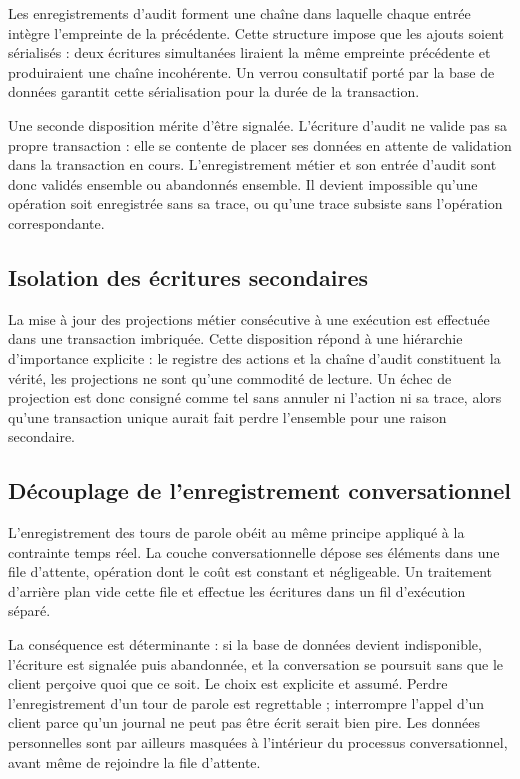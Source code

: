 Les enregistrements d'audit forment une chaîne dans laquelle chaque entrée intègre l'empreinte de la précédente. Cette structure impose que les ajouts soient sérialisés : deux écritures simultanées liraient la même empreinte précédente et produiraient une chaîne incohérente. Un verrou consultatif porté par la base de données garantit cette sérialisation pour la durée de la transaction.

Une seconde disposition mérite d'être signalée. L'écriture d'audit ne valide pas sa propre transaction : elle se contente de placer ses données en attente de validation dans la transaction en cours. L'enregistrement métier et son entrée d'audit sont donc validés ensemble ou abandonnés ensemble. Il devient impossible qu'une opération soit enregistrée sans sa trace, ou qu'une trace subsiste sans l'opération correspondante.

\subsection{Isolation des écritures secondaires}

La mise à jour des projections métier consécutive à une exécution est effectuée dans une transaction imbriquée. Cette disposition répond à une hiérarchie d'importance explicite : le registre des actions et la chaîne d'audit constituent la vérité, les projections ne sont qu'une commodité de lecture. Un échec de projection est donc consigné comme tel sans annuler ni l'action ni sa trace, alors qu'une transaction unique aurait fait perdre l'ensemble pour une raison secondaire.

\subsection{Découplage de l'enregistrement conversationnel}

L'enregistrement des tours de parole obéit au même principe appliqué à la contrainte temps réel. La couche conversationnelle dépose ses éléments dans une file d'attente, opération dont le coût est constant et négligeable. Un traitement d'arrière plan vide cette file et effectue les écritures dans un fil d'exécution séparé.

La conséquence est déterminante : si la base de données devient indisponible, l'écriture est signalée puis abandonnée, et la conversation se poursuit sans que le client perçoive quoi que ce soit. Le choix est explicite et assumé. Perdre l'enregistrement d'un tour de parole est regrettable ; interrompre l'appel d'un client parce qu'un journal ne peut pas être écrit serait bien pire. Les données personnelles sont par ailleurs masquées à l'intérieur du processus conversationnel, avant même de rejoindre la file d'attente.

